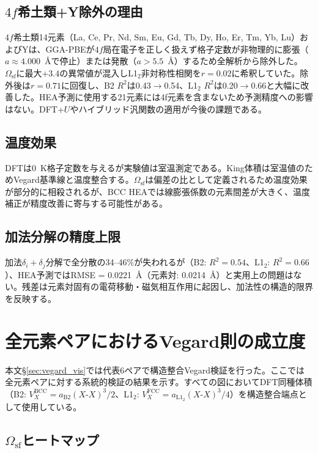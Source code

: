 \documentclass[5p,10pt]{elsarticle}
\begin{document}
\subsection{$4f$希土類+Y除外の理由}
\label{sec:appendix_gdce}

$4f$希土類14元素（La, Ce, Pr, Nd, Sm, Eu, Gd, Tb, Dy, Ho, Er, Tm, Yb, Lu）およびYは、GGA-PBEが$4f$局在電子を正しく扱えず格子定数が非物理的に膨張（$a \approx 4.000$~\AA{}で停止）または発散（$a > 5.5$~\AA）するため全解析から除外した。$\Omega_\text{sf}$に最大$+3.4$の異常値が混入しL1$_2$非対称性相関を$r = 0.02$に希釈していた。除外後は$r = 0.71$に回復し、B2 $R^2$は0.43$\to$0.54、L1$_2$ $R^2$は0.20$\to$0.66と大幅に改善した。HEA予測に使用する21元素には4f元素を含まないため予測精度への影響はない。DFT+$U$やハイブリッド汎関数の適用が今後の課題である。

\subsection{温度効果}

DFTは0~K格子定数を与えるが実験値は室温測定である。King体積は室温値のためVegard基準線と温度整合する。$\Omega_\text{sf}$は偏差の比として定義されるため温度効果が部分的に相殺されるが、BCC HEAでは線膨張係数の元素間差が大きく、温度補正が精度改善に寄与する可能性がある。

\subsection{加法分解の精度上限}

加法$\delta_i + \delta_j$分解で全分散の34--46\%が失われるが（B2: $R^2 = 0.54$、L1$_2$: $R^2 = 0.66$）、HEA予測ではRMSE = 0.0221~\AA{}（元素対: 0.0214~\AA）と実用上の問題はない。残差は元素対固有の電荷移動・磁気相互作用に起因し、加法性の構造的限界を反映する。


\section{全元素ペアにおけるVegard則の成立度}
\label{sec:appendix_vegard_all}

本文§\ref{sec:vegard_vis}では代表6ペアで構造整合Vegard検証を行った。ここでは全元素ペアに対する系統的検証の結果を示す。すべての図においてDFT同種体積（B2: $V_X^\text{BCC} = a_\text{B2}(X\text{-}X)^3/2$、L1$_2$: $V_X^\text{FCC} = a_{\mathrm{L1}_2}(X\text{-}X)^3/4$）を構造整合端点として使用している。

\subsection{$\Omega_\text{sf}$ヒートマップ}
\end{document}
